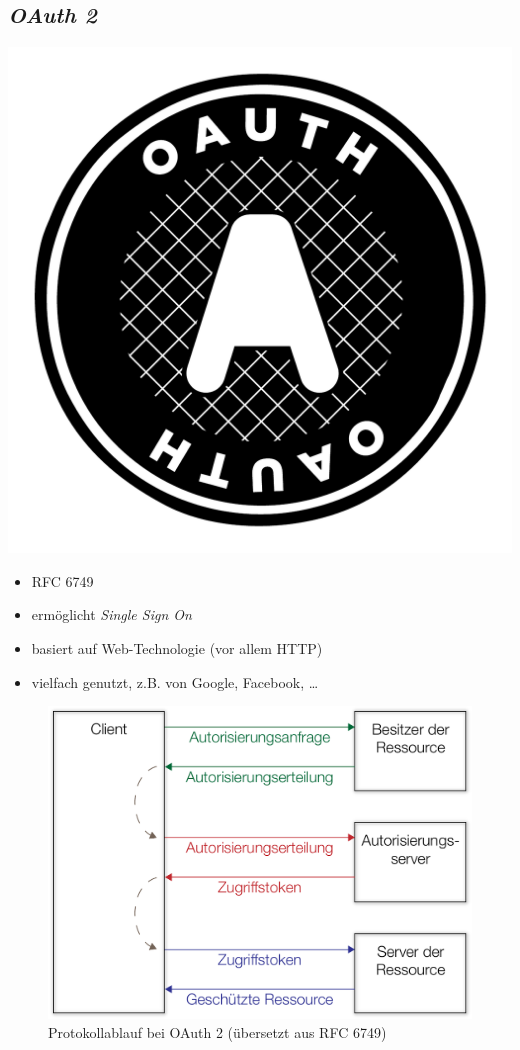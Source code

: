 \documentclass{beamer}
\begin{document}
\subsection{\em OAuth 2}
\begin{frame}{\insertsubsection}
	\centering
	\includegraphics[width=.3\linewidth]{img/oauth}
	\vspace*{12pt}
	\begin{itemize}
		\item RFC 6749 \cite{RFC6749}
		\item ermöglicht \textit{Single Sign On}
		\item basiert auf Web-Technologie (vor allem HTTP)
		\item vielfach genutzt, z.B. von Google, Facebook, …
	\end{itemize}
\end{frame}	

\begin{frame}{\insertsubsection}
	\begin{figure}
		\centering
		\includegraphics[width=.52\linewidth]{img/OAuth2}
		\caption{Protokollablauf bei OAuth 2 (übersetzt aus RFC 6749)}
	\end{figure}
\end{frame}
	
\end{document}
